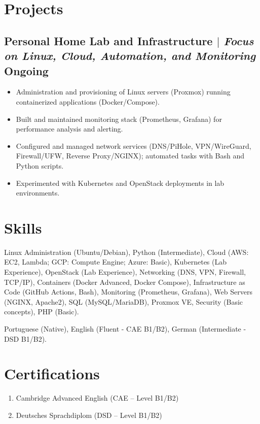 \documentclass[11pt]{article}
\begin{document}
\section{Projects}
\subsection{Personal Home Lab and Infrastructure $|$ {\normalfont\itshape Focus on Linux, Cloud, Automation, and Monitoring} \hfill Ongoing}
\begin{itemize}
    \item Administration and provisioning of Linux servers (Proxmox) running containerized applications (Docker/Compose).
    \item Built and maintained monitoring stack (Prometheus, Grafana) for performance analysis and alerting.
    \item Configured and managed network services (DNS/PiHole, VPN/WireGuard, Firewall/UFW, Reverse Proxy/NGINX); automated tasks with Bash and Python scripts.
    \item Experimented with Kubernetes and OpenStack deployments in lab environments.
\end{itemize}

\section{Skills}
\begin{description}[itemsep=0pt, leftmargin=*, style=unboxed]
	\item[Technical] Linux Administration (Ubuntu/Debian), Python (Intermediate), Cloud (AWS: EC2, Lambda; GCP: Compute Engine; Azure: Basic), Kubernetes (Lab Experience), OpenStack (Lab Experience), Networking (DNS, VPN, Firewall, TCP/IP), Containers (Docker Advanced, Docker Compose), Infrastructure as Code (GitHub Actions, Bash), Monitoring (Prometheus, Grafana), Web Servers (NGINX, Apache2), SQL (MySQL/MariaDB), Proxmox VE, Security (Basic concepts), PHP (Basic).
    \item[Languages] Portuguese (Native), English (Fluent - CAE B1/B2), German (Intermediate - DSD B1/B2).
\end{description}

\section{Certifications}
\begin{enumerate}[label=\null, left=0pt .. \parindent, itemsep=0pt]
	\item Cambridge Advanced English (CAE -- Level B1/B2)
	\item Deutsches Sprachdiplom (DSD -- Level B1/B2)
\end{enumerate}
\end{document}
